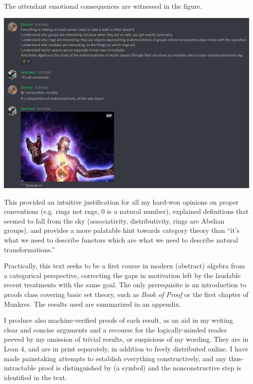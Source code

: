 \documentclass{book}
\begin{document}
The attendant emotional consequences are witnessed in the figure.

\begin{center}
  \includegraphics[scale=0.3]{galaxy_brain.png}
\end{center}

This provided an intuitive justification for all my hard-won opinions on proper conventions (e.g. rings not rngs, 0 is a natural number),
explained definitions that seemed to fall from the sky (associativity, distributivity, rings are Abelian groups),
and provides a more palatable hint towards category theory than ``it's what we need to describe functors which are what we need to describe
natural transformations.''

Practically, this text seeks to be a first course in modern (abstract) algebra from a categorical perspective,
correcting the gaps in motivation left by the laudable recent treatments with the same goal. %
The only prerequisite is an introduction to proofs class covering basic set theory, such as \textit{Book of Proof} or the first chapter of Munkres.
The results used are summarized in an appendix.

I produce also machine-verified proofs of each result, as an aid in my writing clear and concise arguments
and a recourse for the logically-minded reader peeved by my omission of trivial results, or suspicious of my wording.
They are in Lean 4, and are in print separately, in addition to freely distributed online.
I have made painstaking attempts to establish everything constructively, and any thus-intractable proof is distinguished by (a symbol) %
and the nonconstructive step is identified in the text.
\end{document}

